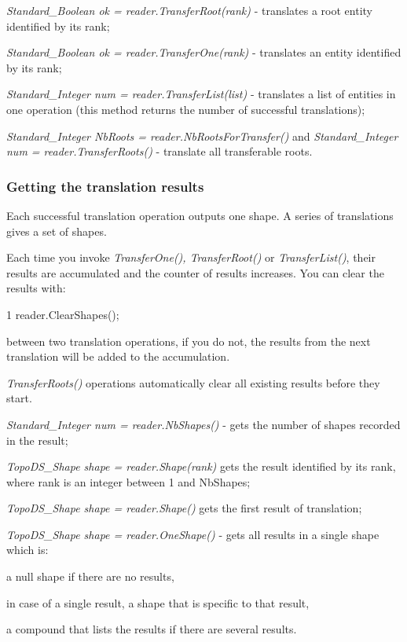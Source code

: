 \begin{DoxyItemize}
\item {\itshape Standard\+\_\+\+Boolean ok = reader.\+Transfer\+Root(rank)} -\/ translates a root entity identified by its rank;
\item {\itshape Standard\+\_\+\+Boolean ok = reader.\+Transfer\+One(rank)} -\/ translates an entity identified by its rank;
\item {\itshape Standard\+\_\+\+Integer num = reader.\+Transfer\+List(list)} -\/ translates a list of entities in one operation (this method returns the number of successful translations);
\item {\itshape Standard\+\_\+\+Integer Nb\+Roots = reader.\+Nb\+Roots\+For\+Transfer()} and {\itshape Standard\+\_\+\+Integer num = reader.\+Transfer\+Roots()} -\/ translate all transferable roots.
\end{DoxyItemize}\hypertarget{occt_user_guides__step_occt_step_2_3_5}{}\subsubsection{Getting the translation results}\label{occt_user_guides__step_occt_step_2_3_5}
Each successful translation operation outputs one shape. A series of translations gives a set of shapes.

Each time you invoke {\itshape Transfer\+One(), Transfer\+Root()} or {\itshape Transfer\+List()}, their results are accumulated and the counter of results increases. You can clear the results with\+: 
\begin{DoxyCode}
1 reader.ClearShapes(); 
\end{DoxyCode}
 between two translation operations, if you do not, the results from the next translation will be added to the accumulation.

{\itshape Transfer\+Roots()} operations automatically clear all existing results before they start.
\begin{DoxyItemize}
\item {\itshape Standard\+\_\+\+Integer num = reader.\+Nb\+Shapes()} -\/ gets the number of shapes recorded in the result;
\item {\itshape Topo\+D\+S\+\_\+\+Shape shape = reader.\+Shape(rank)} gets the result identified by its rank, where rank is an integer between 1 and Nb\+Shapes;
\item {\itshape Topo\+D\+S\+\_\+\+Shape shape = reader.\+Shape()} gets the first result of translation;
\item {\itshape Topo\+D\+S\+\_\+\+Shape shape = reader.\+One\+Shape()} -\/ gets all results in a single shape which is\+:
\begin{DoxyItemize}
\item a null shape if there are no results,
\item in case of a single result, a shape that is specific to that result,
\item a compound that lists the results if there are several results.
\end{DoxyItemize}
\end{DoxyItemize}

